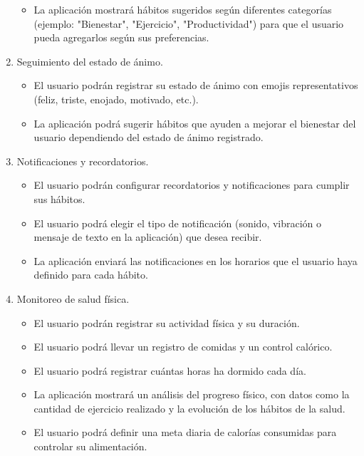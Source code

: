 \documentclass[letterpaper,12pt,oneside]{article}
\begin{document}
\begin{enumerate}
\begin{itemize}
                    \item La aplicación mostrará hábitos sugeridos según diferentes categorías (ejemplo: "Bienestar", "Ejercicio", "Productividad") para que el usuario pueda agregarlos según sus preferencias.
                \end{itemize}
            \item Seguimiento del estado de ánimo.
                \begin{itemize}
                    \item El usuario podrán registrar su estado de ánimo con emojis representativos (feliz, triste, enojado, motivado, etc.).
                    \item La aplicación podrá sugerir hábitos que ayuden a mejorar el bienestar del usuario dependiendo del estado de ánimo registrado.
                \end{itemize}
            \item Notificaciones y recordatorios.
                \begin{itemize}
                    \item El usuario podrán configurar recordatorios y notificaciones para cumplir sus hábitos.
                    \item El usuario podrá elegir el tipo de notificación (sonido, vibración o mensaje de texto en la aplicación) que desea recibir.
                    \item La aplicación enviará las notificaciones en los horarios que el usuario haya definido para cada hábito.
                \end{itemize}
            \item Monitoreo de salud física.
                \begin{itemize}
                    \item El usuario podrán registrar su actividad física y su duración.
                    \item  El usuario podrá llevar un registro de comidas y un control calórico.
                    \item El usuario podrá registrar cuántas horas ha dormido cada día.
                    \item La aplicación mostrará un análisis del progreso físico, con datos como la cantidad de ejercicio realizado y la evolución de los hábitos de la salud.
                    \item  El usuario podrá definir una meta diaria de calorías consumidas para controlar su alimentación.
                \end{itemize}

\end{enumerate}
\end{document}
